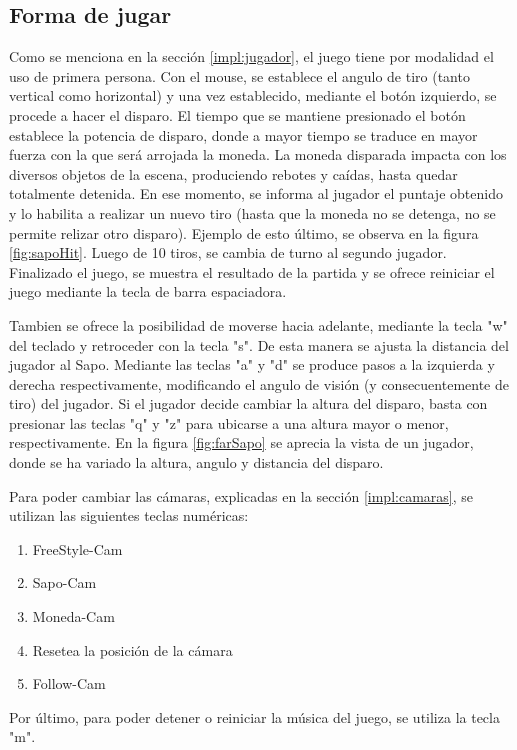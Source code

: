 \documentclass{acm_proc_article-sp}
\begin{document}
\subsection{Forma de jugar}
Como se menciona en la secci\'on \ref{impl:jugador}, el juego tiene por modalidad el uso de primera persona. Con el mouse, se establece el angulo de tiro (tanto vertical como horizontal) y una vez establecido, mediante el bot\'on izquierdo, se procede a hacer el disparo. El tiempo que se mantiene presionado el bot\'on establece la potencia de disparo, donde a mayor tiempo se traduce en mayor fuerza con la que ser\'a arrojada la moneda. La moneda disparada impacta con los diversos objetos de la escena, produciendo rebotes y ca\'idas, hasta quedar totalmente detenida. En ese momento, se informa al jugador el puntaje obtenido y lo habilita a realizar un nuevo tiro (hasta que la moneda no se detenga, no se permite relizar otro disparo). Ejemplo de esto \'ultimo, se observa en la figura \ref{fig:sapoHit}. Luego de 10 tiros, se cambia de turno al segundo jugador. Finalizado el juego, se muestra el resultado de la partida y se ofrece reiniciar el juego mediante la tecla de barra espaciadora.

Tambien se ofrece la posibilidad de moverse hacia adelante, mediante la tecla "w" del teclado y retroceder con la tecla "s". De esta manera se ajusta la distancia del jugador al Sapo. Mediante las teclas "a" y "d" se produce pasos a la izquierda y derecha respectivamente, modificando el angulo de visi\'on (y consecuentemente de tiro) del jugador.
Si el jugador decide cambiar la altura del disparo, basta con presionar las teclas "q" y "z" para ubicarse a una altura mayor o menor, respectivamente. En la figura \ref{fig:farSapo} se aprecia la vista de un jugador, donde se ha variado la altura, angulo y distancia del disparo.


Para poder cambiar las c\'amaras, explicadas en la secci\'on \ref{impl:camaras}, se utilizan las siguientes teclas num\'ericas:
\begin{enumerate}
 \item FreeStyle-Cam
 \item Sapo-Cam
 \item Moneda-Cam 
 \item Resetea la posici\'on de la c\'amara
 \item Follow-Cam 
\end{enumerate}

Por \'ultimo, para poder detener o reiniciar la m\'usica del juego, se utiliza la tecla "m". 
\end{document}

